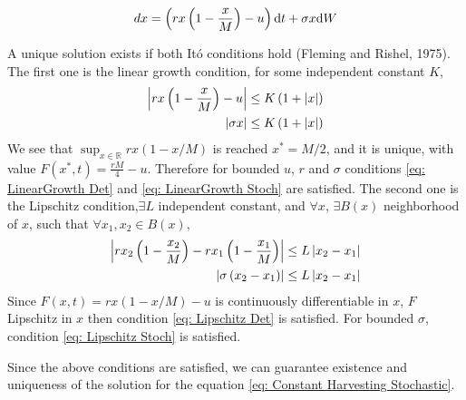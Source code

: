 \begin{equation}
	dx=\left(rx\left(1-\frac{x}{M}\right)-u\right)\mathrm{d} t+\sigma x\mathrm{d} W \label{eq: Constant Harvesting Stochastic}
\end{equation}

A unique solution exists if both It\'o conditions hold (Fleming and Rishel, 1975). The first one is the linear growth condition, for some independent constant $K$,
\begin{align}
	\left|rx\left(1-\frac{x}{M}\right)-u\right|&\leq K\left(1+\left|x\right|\right) \label{eq: LinearGrowth Det}\\
	\left|\sigma x\right|&\leq K\left(1+\left|x\right|\right) \label{eq: LinearGrowth Stoch}
\end{align}
We see that $\sup_{x\in\mathbb{R}} rx(1-x/M)$ is reached $x^*=M/2$, and it is unique, with value $F(x^*,t)=\frac{rM}{4}-u$. Therefore for bounded $u$, $r$ and $\sigma$ conditions \ref{eq: LinearGrowth Det} and \ref{eq: LinearGrowth Stoch} are satisfied. The second one is the Lipschitz condition,$\exists L$ independent constant, and $\forall x$, $\exists B(x)$ neighborhood of $x$, such that $\forall x_1, x_2 \in B(x)$,
\begin{align}
\left|rx_2\left(1-\frac{x_2}{M}\right)-rx_1\left(1-\frac{x_1}{M}\right)\right|&\leq L \left|x_2-x_1\right| \label{eq: Lipschitz Det}\\
\left|\sigma\left(x_2-x_1\right)\right| &\leq L \left|x_2-x_1\right| \label{eq: Lipschitz Stoch}
\end{align}
Since $F(x,t)=rx(1-x/M)-u$ is continuously differentiable in $x$, $F$ Lipschitz in $x$ then condition \ref{eq: Lipschitz Det} is satisfied. For bounded $\sigma$, condition \ref{eq: Lipschitz Stoch} is satisfied.

Since the above conditions are satisfied, we can guarantee existence and uniqueness of the solution for the equation \ref{eq: Constant Harvesting Stochastic}.



